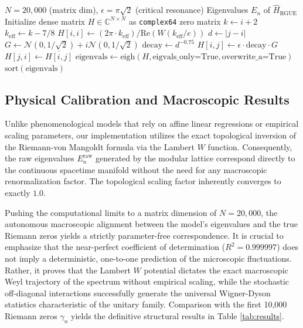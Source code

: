 \documentclass[aps,prl,preprint,superscriptaddress,floatfix]{revtex4-2}
\begin{document}
\begin{algorithm}[H]
\caption{Parameter-Free Riemann-GUE Ensemble Generation}
\label{alg:hamiltonian}
\begin{algorithmic}
\Require $N=20,000$ (matrix dim), $\epsilon=\pi\sqrt{2}$ (critical resonance)
\Ensure Eigenvalues $E_n$ of $\hat{H}_{\text{RGUE}}$
\State Initialize dense matrix $H \in \mathbb{C}^{N \times N}$ as \texttt{complex64} zero matrix
    \State $k \gets i+2$
    \State $k_{\text{eff}} \gets k - 7/8$ 
    \State $H[i,i] \gets (2\pi \cdot k_{\text{eff}}) / \text{Re}(W(k_{\text{eff}}/e))$ 
        \State $d \gets |j-i|$
         
            \State $G \gets \mathcal{N}(0, 1/\sqrt{2}) + i\mathcal{N}(0, 1/\sqrt{2})$ 
            \State $\text{decay} \gets d^{-0.75}$ 
            \State $H[i,j] \gets \epsilon \cdot \text{decay} \cdot G$
            \State $H[j,i] \gets \overline{H[i,j]}$ 
        \EndIf
    \EndFor
\EndFor
\State $\text{eigenvals} \gets \text{eigh}(H, \text{eigvals\_only=True}, \text{overwrite\_a=True})$
\State \Return $\text{sort}(\text{eigenvals})$
\end{algorithmic}
\end{algorithm}

\subsection{Physical Calibration and Macroscopic Results}
Unlike phenomenological models that rely on affine linear regressions or empirical scaling parameters, our implementation utilizes the exact topological inversion of the Riemann-von Mangoldt formula via the Lambert $W$ function. Consequently, the raw eigenvalues $E_n^{\text{raw}}$ generated by the modular lattice correspond directly to the continuous spacetime manifold without the need for any macroscopic renormalization factor. The topological scaling factor inherently converges to exactly $1.0$.

Pushing the computational limits to a matrix dimension of $N=20,000$, the autonomous macroscopic alignment between the model's eigenvalues and the true Riemann zeros yields a strictly parameter-free correspondence. It is crucial to emphasize that the near-perfect coefficient of determination ($R^2 = 0.999997$) does not imply a deterministic, one-to-one prediction of the microscopic fluctuations. Rather, it proves that the Lambert $W$ potential dictates the exact macroscopic Weyl trajectory of the spectrum without empirical scaling, while the stochastic off-diagonal interactions successfully generate the universal Wigner-Dyson statistics characteristic of the unitary family. Comparison with the first 10,000 Riemann zeros $\gamma_n$ yields the definitive structural results in Table \ref{tab:results}.
\end{document}
